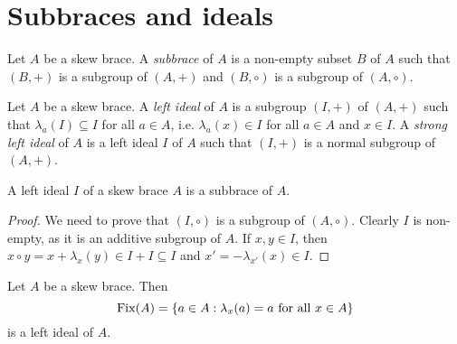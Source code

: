 

\section*{Subbraces and ideals}

\begin{definition}
Let $A$ be a skew brace. A \emph{subbrace} of $A$ is a non-empty 
subset $B$ of $A$ such that $(B,+)$ is a subgroup of $(A,+)$ and $(B,\circ)$ is a subgroup of $(A,\circ)$. 
\end{definition}

\begin{definition}
    Let $A$ be a skew brace. A \emph{left ideal} of $A$ is a subgroup $(I,+)$ of
	$(A,+)$ such that $\lambda_a(I)\subseteq I$ for all $a\in A$, i.e. $\lambda_a(x)\in I$ for all $a\in A$ and $x\in I$. A \emph{strong left ideal} of $A$ 
	is a left ideal $I$ of $A$ such that $(I,+)$ is a normal subgroup of $(A,+)$. 
\end{definition}

\begin{proposition}
    A left ideal $I$ of a skew brace $A$ is a subbrace of $A$. 
\end{proposition}

\begin{proof}
    We need to prove that $(I,\circ)$ is a subgroup of $(A,\circ)$. Clearly $I$ is non-empty, 
    as it is an additive subgroup of $A$. If $x,y\in I$, then
    $x\circ y=x+\lambda_x(y)\in I+I\subseteq I$ and $x'=-\lambda_{x'}(x)\in I$. 
\end{proof}

\begin{example}
    Let $A$ be a skew brace. Then 
    \[
    \operatorname{Fix}(A)=\{a\in A:\lambda_x(a)=a\text{ for all $x\in A$}\}
    \]
    is a left ideal of $A$. 
\end{example}

